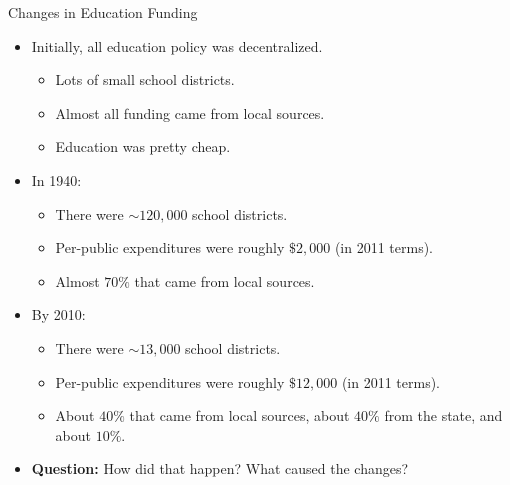 \documentclass[handout]{beamer}
\begin{document}
\begin{frame}{Changes in Education Funding}
\begin{itemize}
\item Initially, all education policy was decentralized. 
	\begin{itemize}
	\item Lots of small school districts. 
	\item Almost all funding came from local sources. 
	\item Education was pretty cheap.
	\end{itemize}
\item In 1940:
	\begin{itemize}
	\item There were $\sim 120,000$ school districts.
	\item Per-public expenditures were roughly $\$2,000$ (in 2011 terms).
	\item Almost $70\%$ that came from local sources.
	\end{itemize}
\item By 2010:
	\begin{itemize}
	\item There were $\sim 13,000$ school districts.
	\item Per-public expenditures were roughly $\$12,000$ (in 2011 terms).
	\item About $40\%$ that came from local sources, about $40\%$ from the state, and about $10\%$.
	\end{itemize}
\pause
\item \textbf{Question:} How did that happen? What caused the changes?
\end{itemize}
\end{frame}
\end{document}
